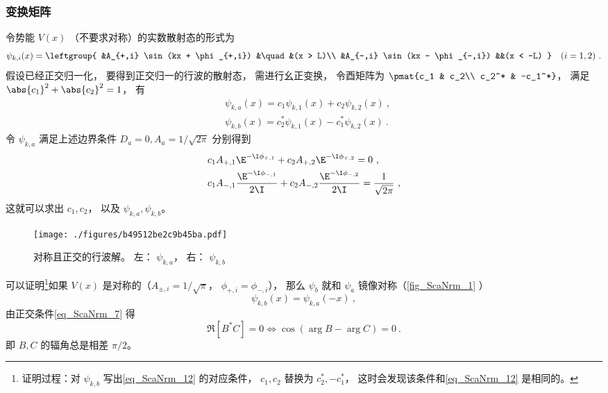 \subsubsection{变换矩阵}
令势能 $V(x)$ （不要求对称）的实数散射态的形式为
\begin{equation}
\psi_{k,i}(x) = \leftgroup{
    &A_{+,i} \sin(kx + \phi_{+,i}) &\quad &(x > L)\\
    &A_{-,i} \sin(kx - \phi_{-,i}) &&(x < -L)
} \quad (i = 1,2)~.
\end{equation}
假设已经正交归一化， 要得到正交归一的行波的散射态， 需进行幺正变换， 令酉矩阵为 $\pmat{c_1 & c_2\\ c_2^* & -c_1^*}$， 满足 $\abs{c_1}^2 + \abs{c_2}^2 = 1$， 有
\begin{equation}
\begin{aligned}
&\psi_{k,a}(x) = c_1\psi_{k,1}(x) + c_2\psi_{k,2}(x)~,\\
&\psi_{k,b}(x) = c_2^*\psi_{k,1}(x) - c_1^*\psi_{k,2}(x)~.
\end{aligned}
\end{equation}
令 $\psi_{k,a}$ 满足上述边界条件 $D_a = 0, A_a = 1/\sqrt{2\pi}$ 分别得到
\begin{equation}\label{eq_ScaNrm_12}
\begin{aligned}
&c_1 A_{+,1}\E^{-\I\phi_{+,1}} + c_2 A_{+,2}\E^{-\I\phi_{+,2}} = 0~,\\
&c_1 A_{-,1}\frac{\E^{-\I\phi_{-,1}}}{2\I} + c_2 A_{-,2}\frac{\E^{-\I\phi_{-,2}}}{2\I} = \frac{1}{\sqrt{2\pi}}~,
\end{aligned}
\end{equation}
这就可以求出 $c_1, c_2$， 以及 $\psi_{k,a}, \psi_{k,b}$。

\begin{figure}[ht]
\centering
\texttt{[image: ./figures/b49512be2c9b45ba.pdf]}
\caption{对称且正交的行波解。 左： $\psi_{k,a}$， 右： $\psi_{k,b}$} \label{fig_ScaNrm_1}
\end{figure}

可以证明\footnote{证明过程：对 $\psi_{k,b}$ 写出\autoref{eq_ScaNrm_12} 的对应条件， $c_1,c_2$ 替换为 $c_2^*, -c_1^*$， 这时会发现该条件和\autoref{eq_ScaNrm_12} 是相同的。}如果 $V(x)$ 是对称的（$A_{\pm,i} = 1/\sqrt{\pi}$， $\phi_{+,i}=\phi_{-,i}$）， 那么 $\psi_b$ 就和 $\psi_a$ 镜像对称（\autoref{fig_ScaNrm_1} ）
\begin{equation}
\psi_{k,b}(x) = \psi_{k,a}(-x)~,
\end{equation}
由正交条件\autoref{eq_ScaNrm_7} 得
\begin{equation}\label{eq_ScaNrm_11}
\Re[B^*C] = 0 \Longleftrightarrow \cos(\arg{B} - \arg{C}) = 0~.
\end{equation}
即 $B,C$ 的辐角总是相差 $\pi/2$。
